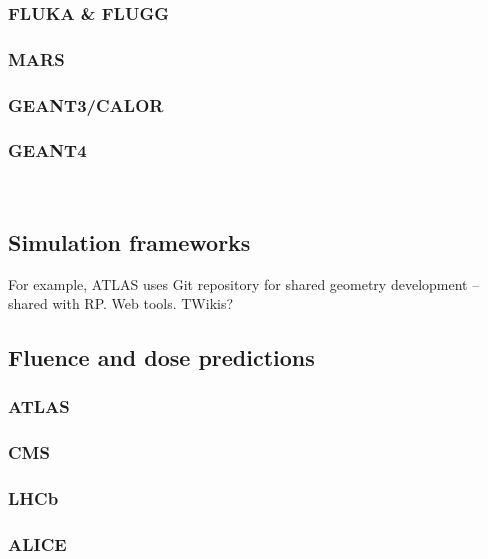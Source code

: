 \subsubsection{FLUKA \& FLUGG}
\subsubsection{MARS}
\subsubsection{GEANT3/CALOR}
\subsubsection{GEANT4}
~

\subsection{Simulation frameworks}
For example, ATLAS uses Git repository for shared geometry development -- shared with RP. Web tools. TWikis? 


\subsection{Fluence and dose predictions}

\subsubsection{ATLAS}

\subsubsection{CMS}

\subsubsection{LHCb}

\subsubsection{ALICE}

\begin{thebibliography}{99}
\end{thebibliography}

 
